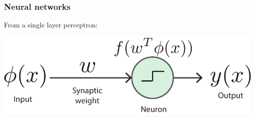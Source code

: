 \documentclass[10pt]{beamer}
\begin{document}
%
%
%	
%
%
%
%
%	
%


\begin{frame}[fragile]
\frametitle{Neural networks}

From a single layer perceptron:\\

	\centerline{\includegraphics[scale=0.5]{figures/Rosenblatt_neuron.pdf}}
	

\end{frame}
\end{document}
